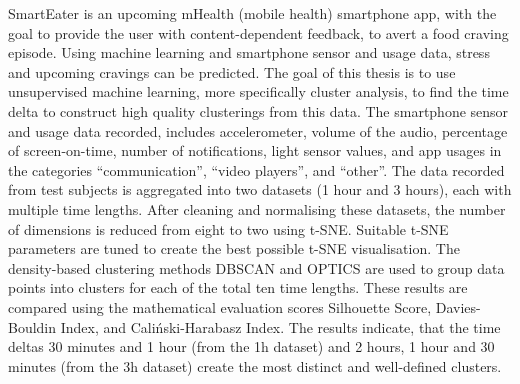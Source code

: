 SmartEater is an upcoming mHealth (mobile health) smartphone app, with the goal to provide the user with content-dependent feedback, to avert a food craving episode. Using machine learning and  smartphone sensor and usage data, stress and upcoming cravings can be predicted. The goal of this thesis is to use unsupervised machine learning, more specifically cluster analysis, to find the time delta to construct high quality clusterings from this data. The smartphone sensor and usage data recorded, includes accelerometer, volume of the audio, percentage of screen-on-time, number of notifications, light sensor values, and app usages in the categories “communication”, “video players”, and “other”. The data recorded from test subjects is aggregated into two datasets (1 hour and 3 hours), each with multiple time lengths. After cleaning and normalising these datasets, the number of dimensions is reduced from eight to two using t-SNE. Suitable t-SNE parameters are tuned to create the best possible t-SNE visualisation. The density-based clustering methods DBSCAN and OPTICS are used to group data points into clusters for each of the total ten time lengths. These results are compared using the mathematical evaluation scores Silhouette Score, Davies-Bouldin Index, and Caliński-Harabasz Index. The results indicate, that the time deltas 30 minutes and 1 hour (from the 1h dataset) and 2 hours, 1 hour and 30 minutes (from the 3h dataset) create the most distinct and well-defined clusters.
